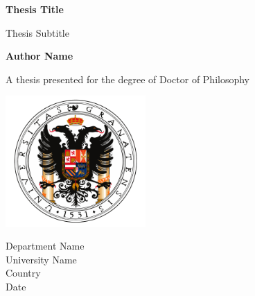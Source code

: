 \begin{titlepage}
    \begin{center}
        \vspace*{0.8cm}

        \Huge\textbf{Thesis Title}

        \vspace{0.4cm}

        \LARGE Thesis Subtitle

        \vspace{1.0cm}

        \textbf{Author Name}

        \vfill

        A thesis presented for the degree of Doctor of Philosophy

        \vspace{0.8cm}

        \includegraphics[width=0.4\textwidth]{images/university_logo.png}

        \Large
        Department Name\\
        University Name\\
        Country\\
        Date
    \end{center}
\end{titlepage}
